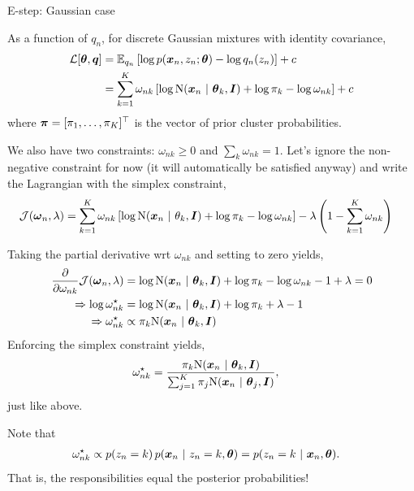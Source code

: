 \documentclass[aspectratio=169]{beamer}
\begin{document}
\begin{frame}[t, allowframebreaks]{E-step: Gaussian case}\label{e-step-gaussian-case}

As a function of \(q_n\), for discrete Gaussian mixtures with identity
covariance, \begin{align*}
    \mathcal{L}[\boldsymbol{\theta}, \boldsymbol{q}] 
    &= \mathbb{E}_{q_n}\left[ \log p(\boldsymbol{x}_n, z_n; \boldsymbol{\theta}) - \log q_n(z_n)\right] + c \\
    &= \sum_{k=1}^K \omega_{nk} \left[ \log \mathrm{N}(\boldsymbol{x}_n ~\vert~ \boldsymbol{\theta}_k, \boldsymbol{I}) + \log \pi_k - \log \omega_{nk} \right] + c
\end{align*} where \(\boldsymbol{\pi} = [\pi_1, \ldots, \pi_K]^\top\) is the vector
of prior cluster probabilities.

We also have two constraints: \(\omega_{nk} \geq 0\) and
\(\sum_k \omega_{nk} = 1\). Let's ignore the non-negative constraint for
now (it will automatically be satisfied anyway) and write the Lagrangian
with the simplex constraint, \begin{align*}
    \mathcal{J}(\boldsymbol{\omega}_n, \lambda) &= \sum_{k=1}^K \omega_{nk} \left[ \log \mathrm{N}(\boldsymbol{x}_n ~\vert~ \theta_k, \boldsymbol{I}) + \log \pi_k - \log \omega_{nk} \right] - \lambda \left( 1 - \sum_{k=1}^K \omega_{nk} \right)
\end{align*}

Taking the partial derivative wrt \(\omega_{nk}\) and setting to zero
yields, \begin{align*}
    \frac{\partial}{\partial \omega_{nk}} \mathcal{J}(\boldsymbol{\omega}_n, \lambda) 
    &= \log \mathrm{N}(\boldsymbol{x}_n ~\vert~ \boldsymbol{\theta}_k, \boldsymbol{I}) + \log \pi_k - \log \omega_{nk} - 1 + \lambda = 0 \\
    \Rightarrow \log \omega_{nk}^\star &= \log \mathrm{N}(\boldsymbol{x}_n ~\vert~ \boldsymbol{\theta}_k, \boldsymbol{I}) + \log \pi_k + \lambda - 1 \\
    \Rightarrow \omega_{nk}^\star &\propto \pi_k \mathrm{N}(\boldsymbol{x}_n ~\vert~ \boldsymbol{\theta}_k, \boldsymbol{I}) 
\end{align*} Enforcing the simplex constraint yields, \begin{align*}
    \omega_{nk}^\star &= \frac{\pi_k \mathrm{N}(\boldsymbol{x}_n ~\vert~ \boldsymbol{\theta}_k, \boldsymbol{I})}{\sum_{j=1}^K \pi_j \mathrm{N}(\boldsymbol{x}_n ~\vert~ \boldsymbol{\theta}_j, \boldsymbol{I})},
\end{align*} just like above.

Note that \begin{align*}
    \omega_{nk}^\star &\propto p(z_n=k) \, p(\boldsymbol{x}_n ~\vert~ z_n=k, \boldsymbol{\theta}) = p(z_n = k ~\vert~ \boldsymbol{x}_n, \boldsymbol{\theta}) .
\end{align*} That is, the responsibilities equal the posterior
probabilities!
\end{frame}
\end{document}

